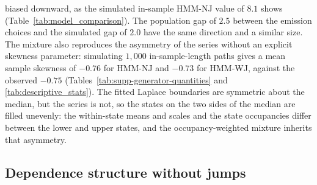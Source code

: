biased downward, as the simulated in-sample HMM-NJ value of $8.1$
shows (Table~\ref{tab:model_comparison}). The population gap of $2.5$
between the emission choices and the simulated gap of $2.0$ have the
same direction and a similar size. The mixture also reproduces the asymmetry of the series without an
explicit skewness parameter: simulating $1{,}000$ in-sample-length
paths gives a mean sample skewness of $-0.76$ for HMM-NJ and $-0.73$
for HMM-WJ, against the observed $-0.75$
(Tables~\ref{tab:supp-generator-quantities}
and \ref{tab:descriptive_stats}). The fitted Laplace boundaries are
symmetric about the median, but the series is not, so the states on
the two sides of the median are filled unevenly: the within-state
means and scales and the state occupancies differ between the lower
and upper states, and the occupancy-weighted mixture inherits that
asymmetry.

\subsection{Dependence structure without jumps}
\label{sec:supp-gen-nojump}

